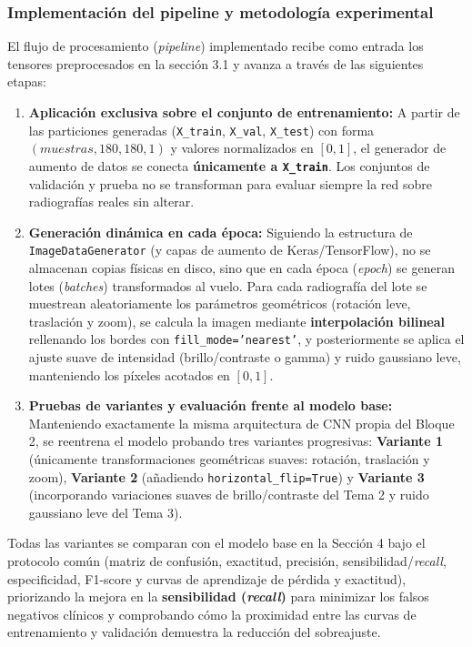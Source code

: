 \documentclass[11pt, a4paper]{article}
\numberwithin{equation}{section}
\begin{document}
\subsubsection{Implementación del pipeline y metodología experimental}
El flujo de procesamiento (\textit{pipeline}) implementado recibe como entrada los tensores preprocesados en la sección 3.1 y avanza a través de las siguientes etapas:
\begin{enumerate}
    \item \textbf{Aplicación exclusiva sobre el conjunto de entrenamiento:} A partir de las particiones generadas (\texttt{X\_train}, \texttt{X\_val}, \texttt{X\_test}) con forma $(muestras, 180, 180, 1)$ y valores normalizados en $[0, 1]$, el generador de aumento de datos se conecta \textbf{únicamente a \texttt{X\_train}}. Los conjuntos de validación y prueba no se transforman para evaluar siempre la red sobre radiografías reales sin alterar.
    \item \textbf{Generación dinámica en cada época:} Siguiendo la estructura de \texttt{ImageDataGenerator} (y capas de aumento de Keras/TensorFlow), no se almacenan copias físicas en disco, sino que en cada época (\textit{epoch}) se generan lotes (\textit{batches}) transformados al vuelo. Para cada radiografía del lote se muestrean aleatoriamente los parámetros geométricos (rotación leve, traslación y zoom), se calcula la imagen mediante \textbf{interpolación bilineal} rellenando los bordes con \texttt{fill\_mode='nearest'}, y posteriormente se aplica el ajuste suave de intensidad (brillo/contraste o gamma) y ruido gaussiano leve, manteniendo los píxeles acotados en $[0, 1]$.
    \item \textbf{Pruebas de variantes y evaluación frente al modelo base:} Manteniendo exactamente la misma arquitectura de CNN propia del Bloque 2, se reentrena el modelo probando tres variantes progresivas: \textbf{Variante 1} (únicamente transformaciones geométricas suaves: rotación, traslación y zoom), \textbf{Variante 2} (añadiendo \texttt{horizontal\_flip=True}) y \textbf{Variante 3} (incorporando variaciones suaves de brillo/contraste del Tema 2 y ruido gaussiano leve del Tema 3).
\end{enumerate}

Todas las variantes se comparan con el modelo base en la Sección 4 bajo el protocolo común (matriz de confusión, exactitud, precisión, sensibilidad/\textit{recall}, especificidad, F1-score y curvas de aprendizaje de pérdida y exactitud), priorizando la mejora en la \textbf{sensibilidad (\textit{recall})} para minimizar los falsos negativos clínicos y comprobando cómo la proximidad entre las curvas de entrenamiento y validación demuestra la reducción del sobreajuste.
\end{document}
